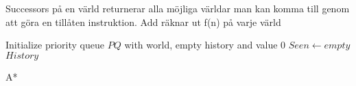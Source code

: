 












Successors på en värld returnerar alla möjliga världar man kan komma till genom
att göra en tillåten instruktion. Add räknar ut f(n) på varje värld
\begin{algorithm}[h!]
 \SetAlgoLined
 Initialize priority queue $PQ$ with world, empty history and value 0\;
 $Seen \leftarrow empty$\;
 \Return $History$
 \caption{A*}
 \label{algorithm:astar}
\end{algorithm}
